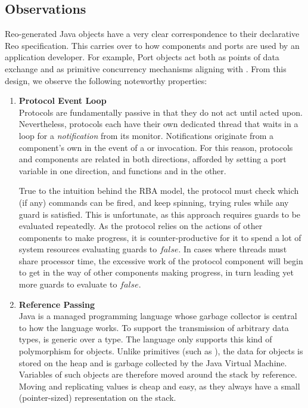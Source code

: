 \subsection{Observations}
\label{sec:java_observations}
Reo-generated Java objects have a very clear correspondence to their declarative Reo specification. This carries over to how components and ports are used by an application developer. For example, Port objects act both as points of data exchange and as primitive concurrency mechanisms aligning  with . From this design, we observe the following noteworthy properties:

\begin{enumerate}
	\item \textbf{Protocol Event Loop}\\
	Protocols are fundamentally passive in that they do not act until acted upon. Nevertheless, protocols each have their own dedicated thread that waits in a loop for a \textit{notification} from its monitor. Notifications originate from a component's own  in the event of a  or  invocation. For this reason, protocols and components are related in both directions, afforded by setting a port variable in one direction, and functions  and  in the other.
	
	True to the intuition behind the RBA model, the protocol must check which (if any) commands can be fired, and keep spinning, trying rules while any guard is satisfied. This is unfortunate, as this approach requires guards to be evaluated repeatedly. As the protocol relies on the actions of other components to make progress, it is counter-productive for it to spend a lot of system resources evaluating guards to $false$. In cases where threads must share processor time, the excessive work of the protocol component will begin to get in the way of other components making progress, in turn leading yet more guards to evaluate to $false$.
	
	\item \textbf{Reference Passing}\\
	Java is a managed programming language whose garbage collector is central to how the language works. To support the transmission of arbitrary data types,  is generic over a type. The language only supports this kind of polymorphism for objects. Unlike primitives (such as ), the data for objects is stored on the heap and is garbage collected by the Java Virtual Machine. Variables of such objects are therefore moved around the stack by reference. Moving and replicating values is cheap and easy, as they always have a small (pointer-sized) representation on the stack.
	

\end{enumerate}
